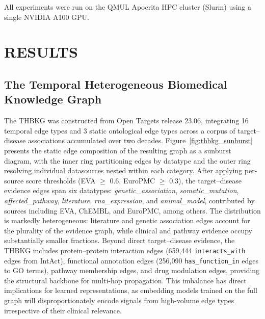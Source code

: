 \documentclass[a4,center]{NAR}
\begin{document}
{\noindent All experiments were run on the QMUL Apocrita HPC cluster
(Slurm) using a single NVIDIA A100 GPU.


\section{RESULTS}

\subsection{The Temporal Heterogeneous Biomedical Knowledge Graph}

The THBKG was constructed from Open Targets release 23.06, integrating
16 temporal edge types and 3 static ontological edge types across a
corpus of target--disease associations accumulated over two decades.
Figure~\ref{fig:thbkg_sunburst} presents the static edge composition of
the resulting graph as a sunburst diagram, with the inner ring partitioning
edges by datatype and the outer ring resolving individual datasources
nested within each category. After applying per-source score thresholds
(EVA $\geq$ 0.6, EuroPMC $\geq$ 0.3), the target--disease evidence edges
span six datatypes: \textit{genetic\_association},
\textit{somatic\_mutation}, \textit{affected\_pathway}, \textit{literature},
\textit{rna\_expression}, and \textit{animal\_model}, contributed by
sources including EVA, ChEMBL, and EuroPMC, among others. The distribution
is markedly heterogeneous: literature and genetic association edges account
for the plurality of the evidence graph, while clinical and pathway evidence
occupy substantially smaller fractions. Beyond direct target--disease
evidence, the THBKG includes protein--protein interaction edges (659{,}444
\texttt{interacts\_with} edges from IntAct), functional annotation edges
(256{,}090 \texttt{has\_function\_in} edges to GO terms), pathway membership
edges, and drug modulation edges, providing the structural backbone for
multi-hop propagation. This imbalance has direct implications for learned
representations, as embedding models trained on the full graph will
disproportionately encode signals from high-volume edge types irrespective
of their clinical relevance.

}
\end{document}

